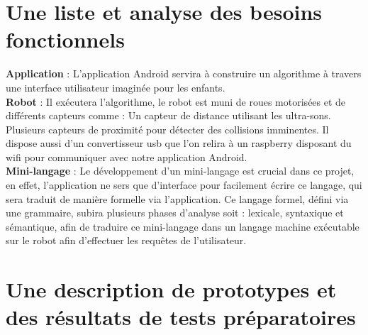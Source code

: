 \documentclass[a4paper]{article}
\begin{document}
\section{Une liste et analyse des besoins fonctionnels}
\textbf{Application} : L’application Android servira à construire un algorithme à travers une interface utilisateur imaginée pour les enfants.\\
\textbf{Robot} : Il exécutera l’algorithme, le robot est muni de roues motorisées et de différents capteurs comme :
Un capteur de distance utilisant les ultra-sons.
Plusieurs capteurs de proximité pour détecter des collisions imminentes.
Il dispose aussi d’un convertisseur usb que l’on relira à un raspberry disposant du wifi pour communiquer avec notre application Android.
\\
\textbf{Mini-langage }: Le développement d’un mini-langage est crucial dans ce projet, en effet, l’application ne sers que d’interface pour facilement écrire ce langage, qui sera traduit de manière formelle via l’application. Ce langage formel, défini via une grammaire, subira plusieurs phases d’analyse soit : lexicale, syntaxique et sémantique, afin de traduire ce mini-langage dans un langage machine exécutable sur le robot afin d’effectuer les requêtes de l’utilisateur.
\section{Une description de prototypes et des résultats de tests préparatoires}
\end{document}
